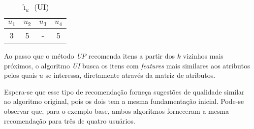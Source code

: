 \begin{table}[p]
\begin{center}
    \caption{$\hat{\imath}_u$ (UI)}
    \label{tab:i_u_ui}
    \begin{tabular}{ | c | c | c | c | } 
    \hline
     $u_1$ & $u_2$ & $u_3$ & $u_4$   \\ \hline
     3 & 5 & - & 5  \\ \hline
    \end{tabular}
\end{center}
\end{table}

Ao passo que o método \textit{UP} recomenda itens a partir dos $k$ vizinhos mais próximos, o algoritmo \textit{UI} busca os itens com \textit{features} mais similares aos atributos pelos quais $u$ se interessa, diretamente através da matriz de atributos. 

Espera-se que esse tipo de recomendação forneça sugestões de qualidade similar ao algoritmo original, pois os dois tem a mesma fundamentação inicial. Pode-se observar que, para o exemplo-base, ambos algoritmos forneceram a mesma recomendação para três de quatro usuários.


